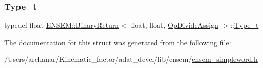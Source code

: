 \mbox{\label{structENSEM_1_1BinaryReturn_3_01float_00_01float_00_01OpDivideAssign_01_4_a9343566dc5cdc2470343502c7d2affe5}} 
\subsubsection{\texorpdfstring{Type\_t}{Type\_t}\hspace{0.1cm}{\footnotesize\ttfamily [2/2]}}
{\footnotesize\ttfamily typedef float \mbox{\hyperlink{structENSEM_1_1BinaryReturn}{E\+N\+S\+E\+M\+::\+Binary\+Return}}$<$ float, float, \mbox{\hyperlink{structENSEM_1_1OpDivideAssign}{Op\+Divide\+Assign}} $>$\+::\mbox{\hyperlink{structENSEM_1_1BinaryReturn_3_01float_00_01float_00_01OpDivideAssign_01_4_a9343566dc5cdc2470343502c7d2affe5}{Type\+\_\+t}}}



The documentation for this struct was generated from the following file\+:\begin{DoxyCompactItemize}
\item 
/\+Users/archanar/\+Kinematic\+\_\+factor/adat\+\_\+devel/lib/ensem/\mbox{\hyperlink{lib_2ensem_2ensem__simpleword_8h}{ensem\+\_\+simpleword.\+h}}\end{DoxyCompactItemize}
